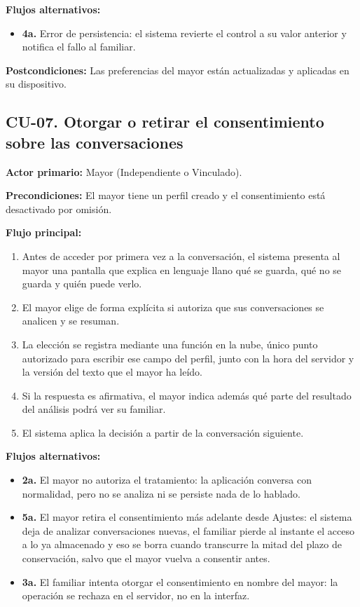 \noindent\textbf{Flujos alternativos:}
\begin{itemize}[nosep]
    \item \textbf{4a.} Error de persistencia: el sistema revierte el control a su valor anterior y
    notifica el fallo al familiar.
\end{itemize}

\noindent\textbf{Postcondiciones:} Las preferencias del mayor están actualizadas y aplicadas en su
dispositivo.

\bigskip

\subsection*{CU-07. Otorgar o retirar el consentimiento sobre las conversaciones}

\noindent\textbf{Actor primario:} Mayor (Independiente o Vinculado).

\noindent\textbf{Precondiciones:} El mayor tiene un perfil creado y el consentimiento está desactivado por
omisión.

\noindent\textbf{Flujo principal:}
\begin{enumerate}[nosep]
    \item Antes de acceder por primera vez a la conversación, el sistema presenta al mayor una pantalla que
    explica en lenguaje llano qué se guarda, qué no se guarda y quién puede verlo.
    \item El mayor elige de forma explícita si autoriza que sus conversaciones se analicen y se resuman.
    \item La elección se registra mediante una función en la nube, único punto autorizado para escribir ese
    campo del perfil, junto con la hora del servidor y la versión del texto que el mayor ha leído.
    \item Si la respuesta es afirmativa, el mayor indica además qué parte del resultado del análisis podrá
    ver su familiar.
    \item El sistema aplica la decisión a partir de la conversación siguiente.
\end{enumerate}

\noindent\textbf{Flujos alternativos:}
\begin{itemize}[nosep]
    \item \textbf{2a.} El mayor no autoriza el tratamiento: la aplicación conversa con normalidad, pero no
    se analiza ni se persiste nada de lo hablado.
    \item \textbf{5a.} El mayor retira el consentimiento más adelante desde Ajustes: el sistema deja de
    analizar conversaciones nuevas, el familiar pierde al instante el acceso a lo ya almacenado y eso se
    borra cuando transcurre la mitad del plazo de conservación, salvo que el mayor vuelva a consentir
    antes.
    \item \textbf{3a.} El familiar intenta otorgar el consentimiento en nombre del mayor: la operación se
    rechaza en el servidor, no en la interfaz.
\end{itemize}

